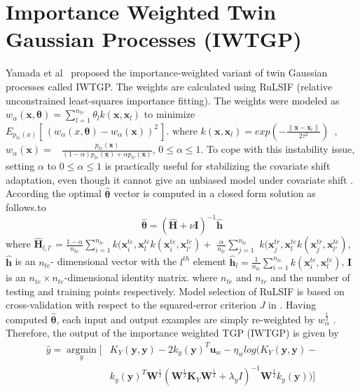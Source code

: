 \section{Importance Weighted Twin Gaussian Processes (IWTGP)}
\label{ss:cstgp}

Yamada et al~\cite{Yamada:2012} proposed the importance-weighted variant of twin Gaussian processes \cite{Bo:2010} called IWTGP.  The weights are calculated using RuLSIF \cite{YamadaSKHS11} (relative unconstrained least-squares importance fitting). The weights were modeled as $w_{\alpha}(\textbf{x},\boldsymbol{\theta}) = \sum_{l=1}^{n_{te}} \theta_l k(\textbf{x}, \textbf{x}_l)$ to minimize $E_{p_{te}(x)} [\,(w_{\alpha}(x,\mathbf{\theta})-w_{\alpha}(\textbf{x}))^2\,]$. where $k(\textbf{x},\textbf{x}_l) = exp(-\frac{\|\textbf{x}-\textbf{x}_l\|}{2 \tau^2})\,\,\,$, $w_{\alpha}(\textbf{x}) =\,\,\,$ $\frac{p_{te}(\textbf{x})}{(1-\alpha) p_{te}(\textbf{x}) +\alpha p_{tr}(\textbf{x})}$, $0\leq\alpha \leq 1$. To cope with this instability issue, setting $\alpha$ to $0 \le\alpha \le 1$ is practically useful for stabilizing the covariate shift adaptation, even though it cannot give an unbiased model under covariate shift \cite{YamadaSKHS11}. According  \cite{Yamada:2012} the optimal $\boldsymbol{\hat{\theta}}$ vector is computed in a closed form solution as follows.to
\begin{equation}
\boldsymbol{\hat{\theta}}= ({\hat{\textbf{H}}} + \nu \textbf{I} )^{-1} {\hat{\textbf{h}}}
\end{equation} 
where  $\hat{\textbf{H}}_{l,l'} = \frac{1-\alpha}{n_{te}}  \sum_{i=1}^{n_{te}} k(\textbf{x}_i^{te}, \textbf{x}_l^{te} k(\textbf{x}_i^{te},\textbf{x}_{l'}^{te}) + $ $\frac{\alpha}{n_{tr}} \sum_{j=1}^{n_{tr}}  $ $ k(\textbf{x}_j^{tr}, \textbf{x}_l^{te} k(\textbf{x}_j^{tr},\textbf{x}_{l'}^{te})$, $\hat{\textbf{h}}$ is an $n_{te}$- dimensional vector with the $l^{th}$ element $\hat{\textbf{h}}_l = \frac{1}{n_{te}} \sum_{i=1}^{n_{te}} k(\textbf{x}_i^{te}, \textbf{x}_l^{te})$, $\textbf{I}$ is an $n_{te}\times n_{te}$-dimensional identity matrix. where $n_{te}$ and $n_{tr}$ and the number of testing and training points respectively. Model selection of RuLSIF is based on cross-validation with respect to the squared-error criterion $J$ in \cite{YamadaSKHS11}. Having computed $\boldsymbol{\hat{\theta}}$, each input and output examples are simply re-weighted by $w_{\alpha}^{\frac{1}{2}}$ \cite{Yamada:2012}. Therefore, the output of the importance
weighted TGP (IWTGP) is given by
\begin{equation}
\begin{split}
\hat{y} =  \underset{y}{\operatorname{argmin       }}[ & K_Y(\textbf{y},\textbf{y}) -2 k_y(\textbf{y})^T \textbf{u}_w - \eta_w  log (K_Y(\textbf{y},\textbf{y}) -\\& k_y(\textbf{y})^T \textbf{W}^\frac{1}{2} (\textbf{W}^\frac{1}{2} \textbf{K}_Y \textbf{W}^\frac{1}{2} +  \lambda_y I)^{-1} \textbf{W}^\frac{1}{2} k_y(\textbf{y}) ) ]
\end{split}
\label{eq:IWTGP}
\end{equation}
